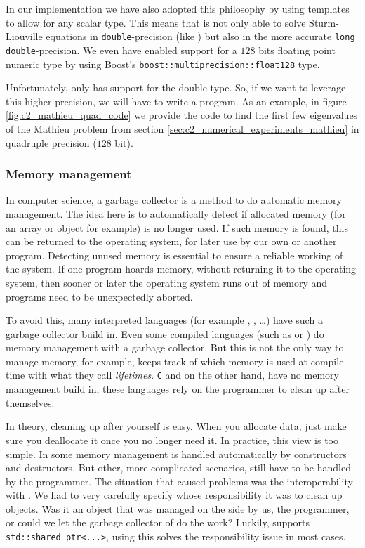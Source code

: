 In our implementation we have also adopted this philosophy by using templates to allow for any scalar type. This means that  is not only able to solve Sturm-Liouville equations in \texttt{double}-precision (like ) but also in the more accurate \texttt{long double}-precision. We even have enabled support for a $128$ bits floating point  numeric type by using Boost's \cite{boost_float128_} \texttt{boost::multiprecision::float128} type.

Unfortunately, \lpython{} only has support for the double type. So, if we want to leverage this higher precision, we will have to write a \cpp{} program. As an example, in figure \ref{fig:c2_mathieu_quad_code} we provide the code to find the first few eigenvalues of the Mathieu problem from section \ref{sec:c2_numerical_experiments_mathieu} in quadruple precision ($128$ bit).

\subsubsection{Memory management}

In computer science, a garbage collector is a method to do automatic memory management. The idea here is to automatically detect if allocated memory (for an array or object for example) is no longer used. If such memory is found, this can be returned to the operating system, for later use by our own or another program. Detecting unused memory is essential to ensure a reliable working of the system. If one program hoards memory, without returning it to the operating system, then sooner or later the operating system runs out of memory and programs need to be unexpectedly aborted.

To avoid this, many interpreted languages (for example \lpython{}, \javascript{}, \matlab{}\dots) have such a garbage collector build in. Even some compiled languages (such as \java{} or \csharp{}) do memory management with a garbage collector. But this is not the only way to manage memory, \rust{} for example, keeps track of which memory is used at compile time with what they call \emph{lifetimes}. \texttt{C} and \cpp{} on the other hand, have no memory management build in, these languages rely on the programmer to clean up after themselves.

In theory, cleaning up after yourself is easy. When you allocate data, just make sure you deallocate it once you no longer need it. In practice, this view is too simple. In \cpp{} some memory management is handled automatically by constructors and destructors. But other, more complicated scenarios, still have to be handled by the programmer. The situation that caused problems was the interoperability with \lpython{}. We had to very carefully specify whose responsibility it was to clean up objects. Was it an object that was managed on the \cpp{} side by us, the programmer, or could we let the garbage collector of \lpython{} do the work? Luckily, \pybind{} supports \texttt{std::shared\_ptr<...>}, using this solves the responsibility issue in most cases.

